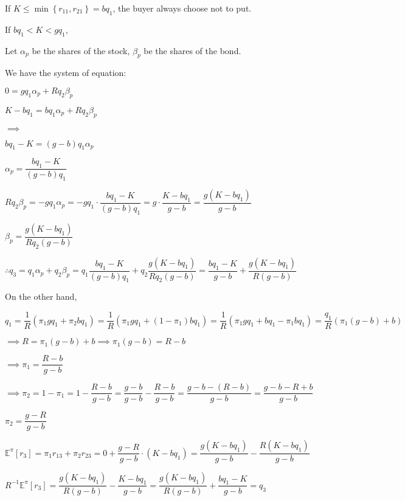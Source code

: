 \documentclass{article}
\begin{document}
If $K\leqslant\min\left\{r_{11}, r_{21}\right\}=bq_{1}$, the buyer always choose not to put. 

If $bq_{1}<K<gq_{1}$,

Let $\alpha_{p}$ be the shares of the stock, $\beta_{p}$ be the shares of the bond.

We have the system of equation:

$0=gq_{1}\alpha_{p}+Rq_{2}\beta_{p}$

$K-bq_{1}=bq_{1}\alpha_{p}+Rq_{2}\beta_{p}$

$\implies$

$bq_{1}-K=\left(g-b\right)q_{1}\alpha_{p}$

$\alpha_{p}=\dfrac{bq_{1}-K}{\left(g-b\right)q_{1}}$

$Rq_{2}\beta_{p}=-gq_{1}\alpha_{p}=-gq_{1}\cdot\dfrac{bq_{1}-K}{\left(g-b\right)q_{1}}=g\cdot\dfrac{K-bq_{1}}{g-b}=\dfrac{g\left(K-bq_{1}\right)}{g-b}$

$\beta_{p}=\dfrac{g\left(K-bq_{1}\right)}{Rq_{2}\left(g-b\right)}$

$\therefore q_{3}=q_{1}\alpha_{p}+q_{2}\beta_{p}=q_{1}\dfrac{bq_{1}-K}{\left(g-b\right)q_{1}}+q_{2}\dfrac{g\left(K-bq_{1}\right)}{Rq_{2}\left(g-b\right)}=\boxed{\dfrac{bq_{1}-K}{g-b}+\dfrac{g\left(K-bq_{1}\right)}{R\left(g-b\right)}}$

On the other hand,

$q_{1}=\dfrac{1}{R}\left(\pi_{1}gq_{1}+\pi_{2}bq_{1}\right)=\dfrac{1}{R}\left(\pi_{1}gq_{1}+\left(1-\pi_{1}\right)bq_{1}\right)=\dfrac{1}{R}\left(\pi_{1}gq_{1}+bq_{1}-\pi_{1}bq_{1}\right)=\dfrac{q_{1}}{R}\left(\pi_{1}\left(g-b\right)+b\right)$

$\implies R=\pi_{1}\left(g-b\right)+b\implies\pi_{1}\left(g-b\right)=R-b$

$\implies\boxed{\pi_{1}=\dfrac{R-b}{g-b}}$

$\implies\pi_{2}=1-\pi_{1}=1-\dfrac{R-b}{g-b}=\dfrac{g-b}{g-b}-\dfrac{R-b}{g-b}=\dfrac{g-b-\left(R-b\right)}{g-b}=\dfrac{g-b-R+b}{g-b}$

$\boxed{\pi_{2}=\dfrac{g-R}{g-b}}$

$\mathbb{E}^{\pi}\left[r_{3}\right]=\pi_{1}r_{13}+\pi_{2}r_{23}=0+\dfrac{g-R}{g-b}\cdot\left(K-bq_{1}\right)=\dfrac{g\left(K-bq_{1}\right)}{g-b}-\dfrac{R\left(K-bq_{1}\right)}{g-b} $

$R^{-1}\mathbb{E}^{\pi}\left[r_{3}\right]=\dfrac{g\left(K-bq_{1}\right)}{R\left(g-b\right)}-\dfrac{K-bq_{1}}{g-b}=\dfrac{g\left(K-bq_{1}\right)}{R\left(g-b\right)}+\dfrac{bq_{1}-K}{g-b}=q_{3}$
\end{document}
